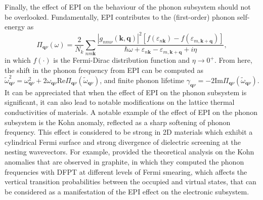 Finally, the effect of EPI on the behaviour of the phonon subsystem should not be overlooked.\cite{giustino2017electron} Fundamentally, EPI contributes to the (first-order) phonon self-energy as
\begin{equation}
    \label{eq:phonon_self_energy}
    \Pi_{\bm{q}\nu}(\omega)=\frac{2}{N_{k}}\sum_{nm\bm{k}}\frac{|g_{nm\nu}(\bm{k},\bm{q})|^2[f(\varepsilon_{n\bm{k}})-f(\varepsilon_{m,\bm{k}+\bm{q}})]}{\hbar\omega+\varepsilon_{n\bm{k}}-\varepsilon_{m,\bm{k}+\bm{q}}+i\eta},
\end{equation}
in which $f(\cdot)$ is the Fermi-Dirac distribution function and $\eta\to 0^+$. From here, the shift in the phonon frequency from EPI can be computed as $\tilde{\omega}_{\bm{q}\nu}^2=\omega_{\bm{q}\nu}^2+2\omega_{\bm{q}\nu}\mbox{Re}\Pi_{\bm{q}\nu}(\tilde{\omega}_{\bm{q}\nu})$, and finite phonon lifetime $\gamma_{\bm{q}\nu}=-2\mbox{Im}\Pi_{\bm{q}\nu}(\tilde{\omega}_{\bm{q}\nu})$. It can be appreciated that when the effect of EPI on the phonon subsystem is significant, it can also lead to notable modifications on the lattice thermal conductivities of materials. A notable example of the effect of EPI on the phonon subsystem is the Kohn anomaly,\cite{kohn1959image} reflected as a sharp softening of phonon frequency. This effect is considered to be strong in 2D materials which exhibit a cylindrical Fermi surface and strong divergence of dielectric screening at the nesting wavevectors.\cite{zhu2015classification} For example, \citet{piscanec2004kohn} provided the theoretical analysis on the Kohn anomalies that are observed in graphite, in which they computed the phonon frequencies with DFPT at different levels of Fermi smearing, which affects the vertical transition probabilities between the occupied and virtual states, that can be considered as a manifestation of the EPI effect on the electronic subsystem.
